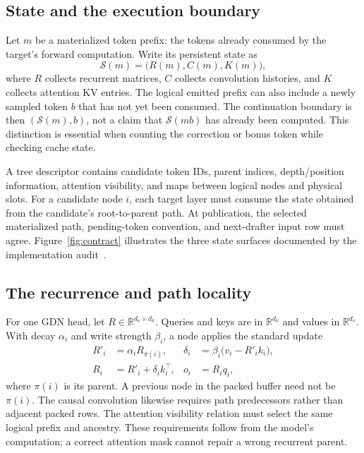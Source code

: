 \documentclass[conference]{IEEEtran}
\begin{document}
\subsection{State and the execution boundary}
Let $m$ be a materialized token prefix: the tokens already consumed by the target's forward computation. Write its persistent state as
\begin{equation}
\mathcal{S}(m)=\bigl(R(m),C(m),K(m)\bigr),
\end{equation}
where $R$ collects recurrent matrices, $C$ collects convolution histories, and $K$ collects attention KV entries. The logical emitted prefix can also include a newly sampled token $b$ that has not yet been consumed. The continuation boundary is then $(\mathcal{S}(m),b)$, not a claim that $\mathcal{S}(mb)$ has already been computed. This distinction is essential when counting the correction or bonus token while checking cache state.

A tree descriptor contains candidate token IDs, parent indices, depth/position information, attention visibility, and maps between logical nodes and physical slots. For a candidate node $i$, each target layer must consume the state obtained from the candidate's root-to-parent path. At publication, the selected materialized path, pending-token convention, and next-drafter input row must agree. Figure~\ref{fig:contract} illustrates the three state surfaces documented by the implementation audit~\cite{lumo2026stateless,lumo2026archive}.

\subsection{The recurrence and path locality}
For one GDN head, let $R\in\mathbb{R}^{d_v\times d_k}$. Queries and keys are in $\mathbb{R}^{d_k}$ and values in $\mathbb{R}^{d_v}$. With decay $\alpha_i$ and write strength $\beta_i$, a node applies the standard update~\cite{yang2024gated}
\begin{align}
R'_i &= \alpha_i R_{\pi(i)}, &
\delta_i &= \beta_i\bigl(v_i-R'_i k_i\bigr),\\
R_i &= R'_i+\delta_i k_i^\top, &
o_i &= R_iq_i,
\end{align}
where $\pi(i)$ is its parent. A previous node in the packed buffer need not be $\pi(i)$. The causal convolution likewise requires path predecessors rather than adjacent packed rows. The attention visibility relation must select the same logical prefix and ancestry. These requirements follow from the model's computation; a correct attention mask cannot repair a wrong recurrent parent.
\end{document}
